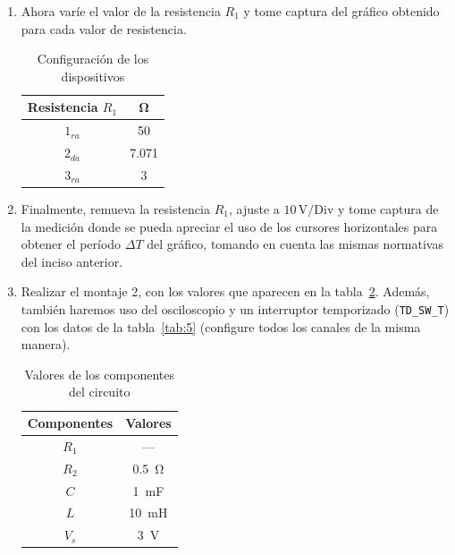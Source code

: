 \documentclass{article}
\begin{document}
\begin{enumerate}
        
        \item Ahora varíe el valor de la resistencia $R_1$ y tome captura del gráfico obtenido para cada valor de resistencia.
        
        \begin{table}[ht]
            \centering
            \begin{tabular}{|c|c|} %
                \midrule 
                Resistencia $R_1$   & \unit{\ohm}   \\
                \midrule
                $1_{ra}$            & 50            \\
                $2_{da}$            & 7.071         \\
                $3_{ra}$            & 3             \\
                \midrule
            \end{tabular}
            \caption{Configuración de los dispositivos}\label{tab:3}
        \end{table}
        
        \item Finalmente, remueva la resistencia $R_1$, ajuste a $10\,\mathrm{V/Div}$ y tome captura de la medición donde se pueda apreciar el uso de los cursores horizontales para obtener el período $\Delta T$ del gráfico, tomando en cuenta las mismas normativas del inciso anterior.
        
        \item Realizar el montaje 2, con los valores que aparecen en la tabla~\ref{tab:4}. Además, también haremos uso del osciloscopio y un interruptor temporizado (\texttt{TD\_SW\_T}) con los datos de la tabla~\ref{tab:5} (configure todos los canales de la misma manera).
        

        \begin{table}[ht]
            \centering
            \begin{tabular}{|c|c|} %
                \midrule 
                Componentes & Valores                   \\
                \midrule
                $R_1$       & ---                       \\
                $R_2$       & \SI{0.5}{\ohm}            \\
                $C$         & \SI{1}{\milli\farad}    \\
                $L$         & \SI{10}{\milli\henry}    \\
                $V_s$       & \SI{3}{\volt}             \\
                \midrule
            \end{tabular}
            \caption{Valores de los componentes del circuito}\label{tab:4}
        \end{table}


\end{enumerate}
\end{document}
